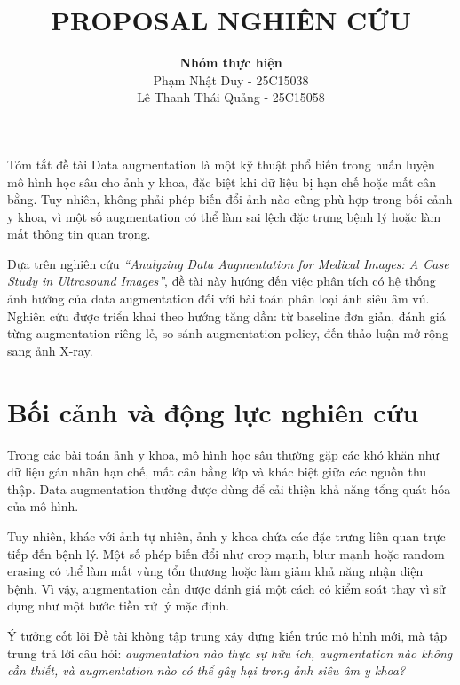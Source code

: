 \documentclass[12pt,a4paper]{article}
\title{
    \vspace{-1.2cm}
    \textbf{\textcolor{mainblue}PROPOSAL NGHIÊN CỨU}}
\author{
    \textbf{Nhóm thực hiện}\\[0.3em]
    Phạm Nhật Duy - 25C15038 \\
    Lê Thanh Thái Quảng - 25C15058
}
\begin{document}
\maketitle


\begin{ideabox}{Tóm tắt đề tài}
Data augmentation là một kỹ thuật phổ biến trong huấn luyện mô hình học sâu cho ảnh y khoa, đặc biệt khi dữ liệu bị hạn chế hoặc mất cân bằng. Tuy nhiên, không phải phép biến đổi ảnh nào cũng phù hợp trong bối cảnh y khoa, vì một số augmentation có thể làm sai lệch đặc trưng bệnh lý hoặc làm mất thông tin quan trọng.

Dựa trên nghiên cứu \textit{``Analyzing Data Augmentation for Medical Images: A Case Study in Ultrasound Images''}, đề tài này hướng đến việc phân tích có hệ thống ảnh hưởng của data augmentation đối với bài toán phân loại ảnh siêu âm vú. Nghiên cứu được triển khai theo hướng tăng dần: từ baseline đơn giản, đánh giá từng augmentation riêng lẻ, so sánh augmentation policy, đến thảo luận mở rộng sang ảnh X-ray.
\end{ideabox}

\section{Bối cảnh và động lực nghiên cứu}

Trong các bài toán ảnh y khoa, mô hình học sâu thường gặp các khó khăn như dữ liệu gán nhãn hạn chế, mất cân bằng lớp và khác biệt giữa các nguồn thu thập. Data augmentation thường được dùng để cải thiện khả năng tổng quát hóa của mô hình.

Tuy nhiên, khác với ảnh tự nhiên, ảnh y khoa chứa các đặc trưng liên quan trực tiếp đến bệnh lý. Một số phép biến đổi như crop mạnh, blur mạnh hoặc random erasing có thể làm mất vùng tổn thương hoặc làm giảm khả năng nhận diện bệnh. Vì vậy, augmentation cần được đánh giá một cách có kiểm soát thay vì sử dụng như một bước tiền xử lý mặc định.

\begin{ideabox}{Ý tưởng cốt lõi}
Đề tài không tập trung xây dựng kiến trúc mô hình mới, mà tập trung trả lời câu hỏi: \textit{augmentation nào thực sự hữu ích, augmentation nào không cần thiết, và augmentation nào có thể gây hại trong ảnh siêu âm y khoa?}
\end{ideabox}
\end{document}
